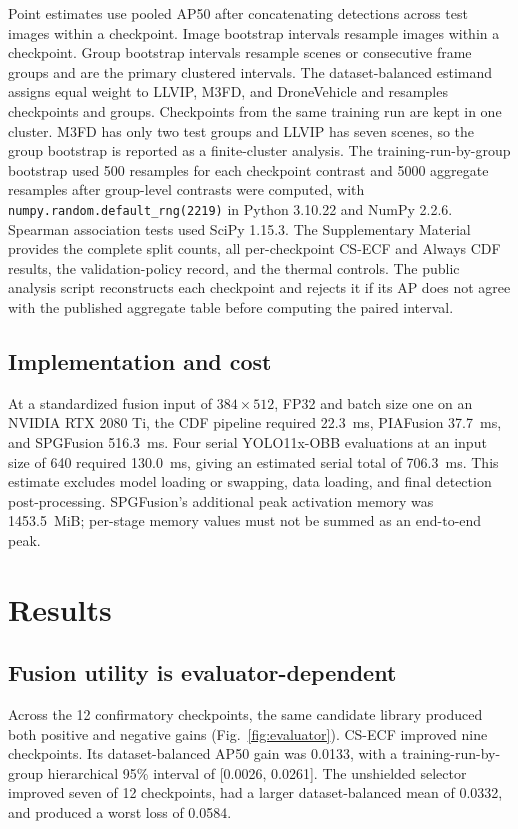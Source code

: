 \documentclass[preprint,11pt]{elsarticle}
\begin{document}
Point estimates use pooled AP50 after concatenating detections across test
images within a checkpoint. Image bootstrap intervals resample images within a
checkpoint. Group bootstrap intervals resample scenes or consecutive frame
groups and are the primary clustered intervals. The dataset-balanced estimand
assigns equal weight to LLVIP, M3FD, and DroneVehicle and resamples checkpoints
and groups. Checkpoints from the same training run are kept in one cluster.
M3FD has only two test groups and LLVIP has seven scenes, so the group bootstrap
is reported as a finite-cluster analysis. The training-run-by-group bootstrap
used 500 resamples for each checkpoint contrast and 5000 aggregate resamples
after group-level contrasts were computed, with
\texttt{numpy.random.default\_rng(2219)} in Python 3.10.22 and NumPy 2.2.6.
Spearman association tests used SciPy 1.15.3.
The Supplementary Material provides the complete split counts, all
per-checkpoint CS-ECF and Always CDF results, the validation-policy record, and
the thermal controls. The public analysis script reconstructs each checkpoint
and rejects it if its AP does not agree with the published aggregate table
before computing the paired interval.

\subsection{Implementation and cost}

At a standardized fusion input of \(384\times512\), FP32 and batch size one on
an NVIDIA RTX 2080 Ti, the CDF pipeline required \SI{22.3}{ms}, PIAFusion
\SI{37.7}{ms}, and SPGFusion \SI{516.3}{ms}. Four serial YOLO11x-OBB evaluations
at an input size of 640 required \SI{130.0}{ms}, giving an estimated serial
total of \SI{706.3}{ms}. This estimate excludes model loading or swapping, data
loading, and final detection post-processing. SPGFusion's additional peak
activation memory was \SI{1453.5}{MiB}; per-stage memory values must not be
summed as an end-to-end peak.

\section{Results}

\subsection{Fusion utility is evaluator-dependent}

Across the 12 confirmatory checkpoints, the same candidate library produced
both positive and negative gains (Fig.~\ref{fig:evaluator}). CS-ECF improved
nine checkpoints. Its dataset-balanced AP50 gain was 0.0133, with a
training-run-by-group hierarchical 95\% interval of [0.0026, 0.0261]. The unshielded
selector improved seven of 12 checkpoints, had a larger dataset-balanced mean of
0.0332, and produced a worst loss of 0.0584.
\end{document}
